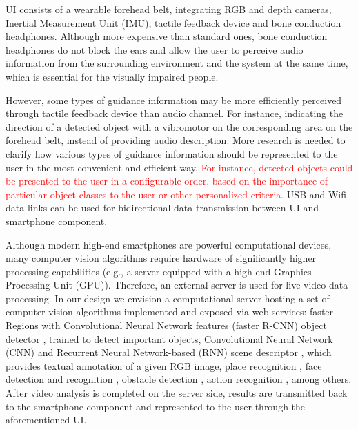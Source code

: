 \documentclass[10pt,conference,compsocconf]{IEEEtran}
\begin{document}

UI consists of a wearable forehead belt, integrating RGB and depth cameras, Inertial Measurement Unit (IMU), tactile feedback device and bone conduction headphones. Although more expensive than standard ones, bone conduction headphones do not block the ears and allow the user to perceive audio information from the surrounding environment and the system at the same time, which is essential for the visually impaired people. 


However, some types of guidance information may be more efficiently perceived through tactile feedback device than audio channel. For instance, indicating the direction of a detected object with a vibromotor on the corresponding area on the forehead belt, instead of providing audio description. More research is needed to clarify how various types of guidance information should be represented to the user in the most convenient and efficient way. \textcolor{red}{For instance, detected objects could be presented to the user in a configurable order, based on the importance of particular object classes to the user or other personalized criteria.} USB and Wifi data links can be used for bidirectional data transmission between UI and smartphone component.



Although modern high-end smartphones are powerful computational devices, many computer vision algorithms  require hardware of significantly higher processing capabilities (e.g., a server equipped with a high-end Graphics Processing Unit (GPU)). Therefore, an external server is used for live video data processing. In our design we envision a computational server hosting a set of computer vision algorithms implemented and exposed via web services: faster Regions with Convolutional Neural Network features (faster R-CNN) object detector \cite{Ren}, trained to detect important objects, Convolutional Neural Network (CNN) and Recurrent Neural Network-based (RNN) scene descriptor \cite{Liu}, which provides textual annotation of a given RGB image, place recognition \cite{Ohn-Bar}, face detection and recognition \cite{Amos}, obstacle detection \cite{Laina}, action recognition \cite{Valor}, among others. After video analysis is completed on the server side, results are transmitted back to the smartphone component and represented to the user through the aforementioned UI.
\end{document}
